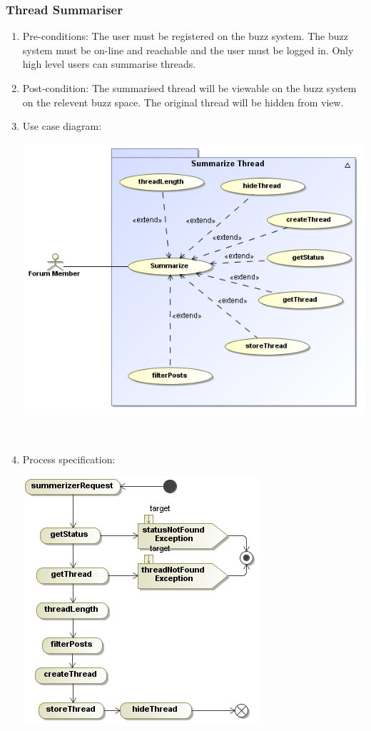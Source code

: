 \documentclass[hidelinks, 12pt, oneside]{article}
\begin{document}
\subsubsection{Thread Summariser}
\begin{enumerate}
 \item Pre-conditions:  The user must be registered on the buzz system. The buzz system must be on-line and reachable and the user must be logged in. Only high level users can summarise threads.
 \item Post-condition:  The summarised thread will be viewable on the buzz system on the relevent buzz space. The original thread will be hidden from view.

\item Use case diagram:\\
   \centerline{\includegraphics[scale=0.4]{SummarizeThreadUseCases}}\\
      \item Process specification:\\ 
\centerline{\includegraphics[scale=0.4]{SummarizeRequestActivities}} 
\end{enumerate}
\end{document}
